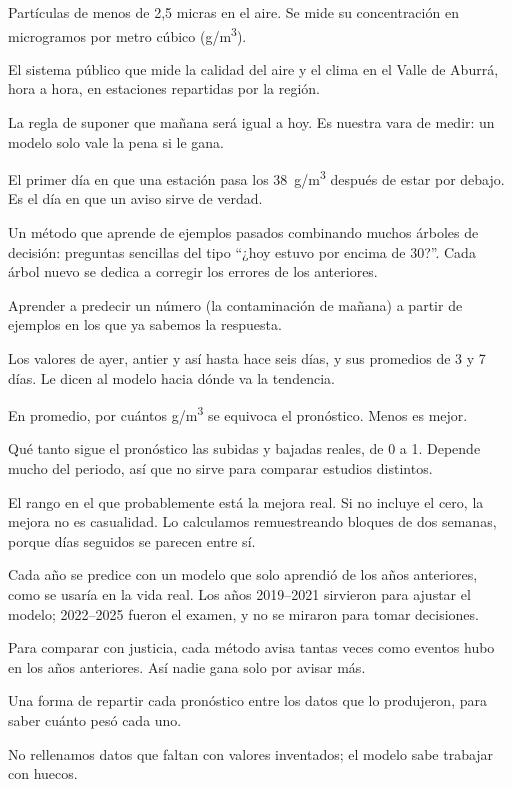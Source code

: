 \documentclass[11pt,a4paper]{article}
\newcommand{\pmd}{PM\textsubscript{2.5}}
\newcommand{\ug}{\textmu g/m\textsuperscript{3}}
\begin{document}
{\small
\begin{description}[style=nextline, leftmargin=0pt, labelsep=0pt, itemsep=2pt, font=\sffamily\bfseries]
\item[\pmd] Partículas de menos de 2,5 micras en el aire. Se mide su concentración en
  microgramos por metro cúbico (\ug).
\item[SIATA] El sistema público que mide la calidad del aire y el clima en el Valle de
  Aburrá, hora a hora, en estaciones repartidas por la región.
\item[Persistencia] La regla de suponer que mañana será igual a hoy. Es nuestra vara de
  medir: un modelo solo vale la pena si le gana.
\item[Inicio de episodio] El primer día en que una estación pasa los 38~\ug{} después de
  estar por debajo. Es el día en que un aviso sirve de verdad.
\item[Modelo (Gradient Boosting)] Un método que aprende de ejemplos pasados combinando
  muchos árboles de decisión: preguntas sencillas del tipo ``¿hoy estuvo por encima de 30?''.
  Cada árbol nuevo se dedica a corregir los errores de los anteriores.
\item[Aprendizaje supervisado de regresión] Aprender a predecir un número (la contaminación
  de mañana) a partir de ejemplos en los que ya sabemos la respuesta.
\item[Días anteriores (rezagos y ventanas)] Los valores de ayer, antier y así hasta hace
  seis días, y sus promedios de 3 y 7 días. Le dicen al modelo hacia dónde va la tendencia.
\item[Error promedio (MAE)] En promedio, por cuántos \ug{} se equivoca el pronóstico. Menos
  es mejor.
\item[Ajuste (R²)] Qué tanto sigue el pronóstico las subidas y bajadas reales, de 0 a 1.
  Depende mucho del periodo, así que no sirve para comparar estudios distintos.
\item[Intervalo de confianza] El rango en el que probablemente está la mejora real. Si no
  incluye el cero, la mejora no es casualidad. Lo calculamos remuestreando bloques de dos
  semanas, porque días seguidos se parecen entre sí.
\item[Examen final (origen móvil)] Cada año se predice con un modelo que solo aprendió de
  los años anteriores, como se usaría en la vida real. Los años 2019--2021 sirvieron para
  ajustar el modelo; 2022--2025 fueron el examen, y no se miraron para tomar decisiones.
\item[Mismo número de avisos] Para comparar con justicia, cada método avisa tantas veces
  como eventos hubo en los años anteriores. Así nadie gana solo por avisar más.
\item[SHAP] Una forma de repartir cada pronóstico entre los datos que lo produjeron, para
  saber cuánto pesó cada uno.
\item[Sin imputar] No rellenamos datos que faltan con valores inventados; el modelo sabe
  trabajar con huecos.
\end{description}
}
\end{document}
